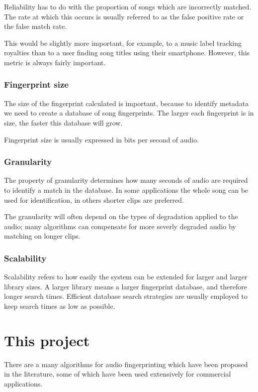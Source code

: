 \documentclass[12pt,a4paper,twoside,openright]{report}
\begin{document}
Reliability has to do with the proportion of songs which are incorrectly matched. The rate at which this occurs is usually referred to as the false positive rate or the false match rate.

This would be slightly more important, for example, to a music label tracking royalties than to a user finding song titles using their smartphone. However, this metric is always fairly important.

\subsubsection{Fingerprint size}

The size of the fingerprint calculated is important, because to identify metadata we need to create a database of song fingerprints. The larger each fingerprint is in size, the faster this database will grow.

Fingerprint size is usually expressed in bits per second of audio.

\subsubsection{Granularity}

The property of granularity determines how many seconds of audio are required to identify a match in the database. In some applications the whole song can be used for identification, in others shorter clips are preferred. 

The granularity will often depend on the types of degradation applied to the audio; many algorithms can compensate for more severly degraded audio by matching on longer clips.

\subsubsection{Scalability}

Scalability refers to how easily the system can be extended for larger and larger library sizes. A larger library means a larger fingerprint database, and therefore longer search times. Efficient database search strategies are usually employed to keep search times as low as possible.


\section{This project}

There are a many algorithms for audio fingerprinting which have been proposed in the literature, some of which have been used extensively for commercial applications. 
\end{document}
